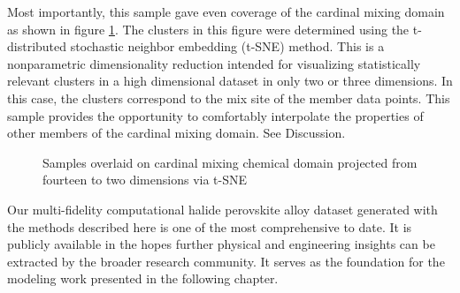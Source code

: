 Most importantly, this sample gave even coverage of the cardinal mixing domain as shown in figure \ref{fig:coverage}.
The clusters in this figure were determined using the t-distributed stochastic neighbor embedding (t-SNE) method.
This is a nonparametric dimensionality reduction intended for visualizing statistically relevant clusters in a high dimensional dataset in only two or three dimensions.
In this case, the clusters correspond to the mix site of the member data points.
This sample provides the opportunity to comfortably interpolate the properties of other members of the cardinal mixing domain.
See Discussion.

 
\begin{figure}[htbp]
\centering

\caption{\label{fig:coverage} Samples overlaid on cardinal mixing chemical domain projected from fourteen to two dimensions via t-SNE}
\end{figure}

Our multi-fidelity computational halide perovskite alloy dataset generated with the methods described here is one of the most comprehensive to date.
It is publicly available in the hopes further physical and engineering insights can be extracted by the broader research community.
It serves as the foundation for the modeling work presented in the following chapter.
